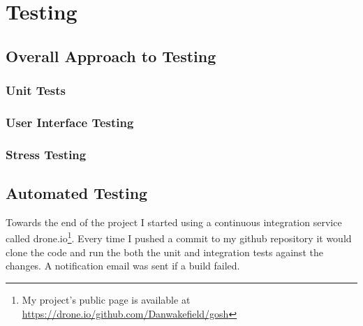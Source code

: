 \chapter{Testing}




\section{Overall Approach to Testing}





\subsection{Unit Tests}

\subsection{User Interface Testing}

\subsection{Stress Testing}

\section{Automated Testing}
Towards the end of the project I started using a continuous integration service called drone.io\footnote{My project's public page is available at \url{https://drone.io/github.com/Danwakefield/gosh}}.
Every time I pushed a commit to my github repository it would clone the code and run the both the unit and integration tests against the changes.
A notification email was sent if a build failed.

